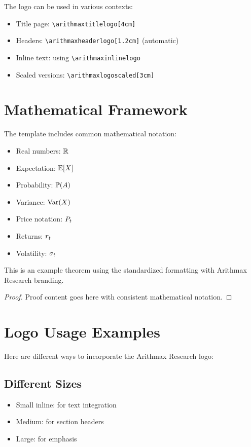 \documentclass[twocolumn,ieee]{arithmaxresearch}
\begin{document}
The logo can be used in various contexts:
\begin{itemize}
    \item Title page: \texttt{\textbackslash arithmaxtitlelogo[4cm]}
    \item Headers: \texttt{\textbackslash arithmaxheaderlogo[1.2cm]} (automatic)
    \item Inline text: \arithmaxinlinelogo[0.6cm] using \texttt{\textbackslash arithmaxinlinelogo}
    \item Scaled versions: \texttt{\textbackslash arithmaxlogoscaled[3cm]}
\end{itemize}

\section{Mathematical Framework}

The template includes common mathematical notation:
\begin{itemize}
    \item Real numbers: $\mathbb{R}$
    \item Expectation: $\mathbb{E}[X]$
    \item Probability: $\mathbb{P}(A)$
    \item Variance: $\text{Var}(X)$
    \item Price notation: $P_{t}$
    \item Returns: $r_{t}$
    \item Volatility: $\sigma_{t}$
\end{itemize}

\begin{theorem}
This is an example theorem using the standardized formatting with Arithmax Research branding.
\end{theorem}

\begin{proof}
Proof content goes here with consistent mathematical notation.
\end{proof}

\section{Logo Usage Examples}

Here are different ways to incorporate the Arithmax Research logo:

\subsection{Different Sizes}
\begin{itemize}
    \item Small inline: \arithmaxinlinelogo[0.5cm] for text integration
    \item Medium: \arithmaxlogoscaled[2cm] for section headers
    \item Large: \arithmaxtitlelogo[3cm] for emphasis
\end{itemize}
\end{document}
